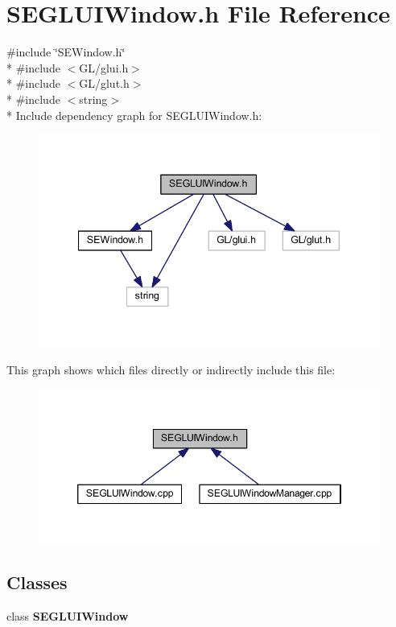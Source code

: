 \section{S\+E\+G\+L\+U\+I\+Window.\+h File Reference}
\label{_s_e_g_l_u_i_window_8h}
{\ttfamily \#include \char`\"{}S\+E\+Window.\+h\char`\"{}}\\*
{\ttfamily \#include $<$G\+L/glui.\+h$>$}\\*
{\ttfamily \#include $<$G\+L/glut.\+h$>$}\\*
{\ttfamily \#include $<$string$>$}\\*
Include dependency graph for S\+E\+G\+L\+U\+I\+Window.\+h\+:
\nopagebreak
\begin{figure}[H]
\begin{center}
\leavevmode
\includegraphics[width=340pt]{_s_e_g_l_u_i_window_8h__incl}
\end{center}
\end{figure}
This graph shows which files directly or indirectly include this file\+:
\nopagebreak
\begin{figure}[H]
\begin{center}
\leavevmode
\includegraphics[width=346pt]{_s_e_g_l_u_i_window_8h__dep__incl}
\end{center}
\end{figure}
\subsection*{Classes}
\begin{DoxyCompactItemize}
\item 
class {\bf S\+E\+G\+L\+U\+I\+Window}
\end{DoxyCompactItemize}
